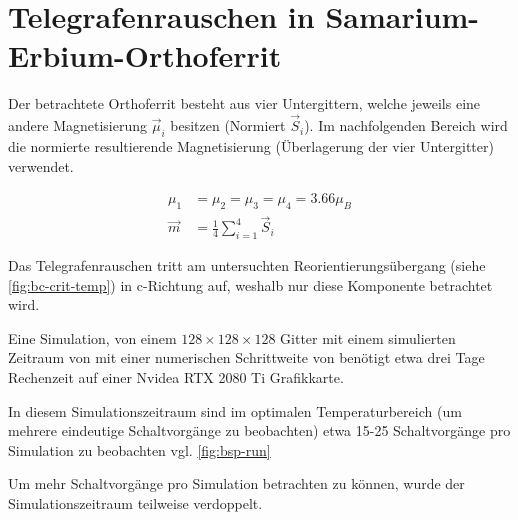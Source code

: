 \documentclass[main.tex]{subfiles}
\begin{document}
\newpage
\section{Telegrafenrauschen in Samarium-Erbium-Orthoferrit}



Der betrachtete Orthoferrit besteht aus vier Untergittern, welche jeweils eine andere Magnetisierung \(\vec{\mu}_i\) besitzen (Normiert \(\vec{S}_i\)). Im nachfolgenden Bereich wird die normierte resultierende Magnetisierung (Überlagerung der vier Untergitter) verwendet.

\begin{align}
    \mu_{1} &=  \mu_{2} = \mu_{3} = \mu_{4} = \num{3.66}\mu_B \\
    \vec{m} &= \frac{1}{4} \sum_{i=1}^4 \vec{S}_i
\end{align}

Das Telegrafenrauschen tritt am untersuchten Reorientierungsübergang (siehe \cref{fig:bc-crit-temp}) in c-Richtung auf, weshalb nur diese Komponente betrachtet wird.

Eine Simulation, von einem \(128 \times 128 \times 128\) Gitter mit einem simulierten Zeitraum von  mit einer numerischen Schrittweite von  benötigt etwa drei Tage Rechenzeit auf einer Nvidea RTX 2080 Ti Grafikkarte. 

In diesem Simulationszeitraum sind im optimalen Temperaturbereich (um mehrere eindeutige Schaltvorgänge zu beobachten) etwa 15-25 Schaltvorgänge pro Simulation zu beobachten vgl. \cref{fig:bsp-run}

Um mehr Schaltvorgänge pro Simulation betrachten zu können, wurde der Simulationszeitraum teilweise verdoppelt.
\end{document}
